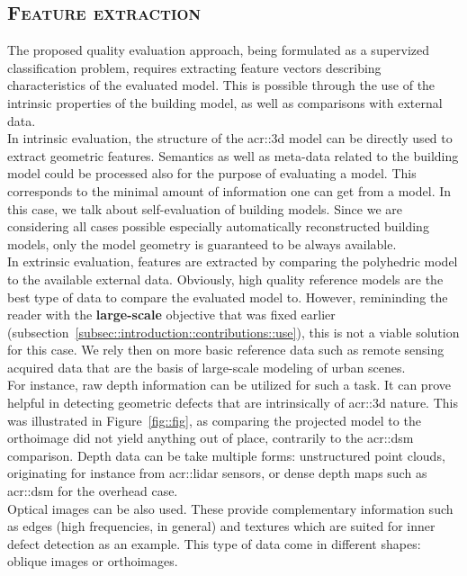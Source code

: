    \subsection{\textsc{Feature extraction}}
        \label{subsec::learned_evaluation::classification::feature_extraction}
        The proposed quality evaluation approach, being formulated as a supervized classification problem, requires extracting feature vectors describing characteristics of the evaluated model.
        This is possible through the use of the intrinsic properties of the building model, as well as comparisons with external data.\\
    
        In intrinsic evaluation, the structure of the \gls{acr::3d} model can be directly used to extract geometric features.
        Semantics as well as meta-data related to the building model could be processed also for the purpose of evaluating a model.
        This corresponds to the minimal amount of information one can get from a model.
        In this case, we talk about self-evaluation of building models.
        Since we are considering all cases possible especially automatically reconstructed building models, only the model geometry is guaranteed to be always available.\\
    
        In extrinsic evaluation, features are extracted by comparing the polyhedric model to the available external data.
        Obviously, high quality reference models are the best type of data to compare the evaluated model to.
        However, remininding the reader with the \textbf{large-scale} objective that was fixed earlier (subsection~\ref{subsec::introduction::contributions::use}), this is not a viable solution for this case.
        We rely then on more basic reference data such as remote sensing acquired data that are the basis of large-scale modeling of urban scenes.\\
        For instance, raw depth information can be utilized for such a task.
        It can prove helpful in detecting geometric defects that are intrinsically of \gls{acr::3d} nature.
        This was illustrated in Figure~\ref{fig::fig}, as comparing the projected model to the orthoimage did not yield anything out of place, contrarily to the \gls{acr::dsm} comparison.
        Depth data can be take multiple forms: unstructured point clouds, originating for instance from \gls{acr::lidar} sensors, or dense depth maps such as \gls{acr::dsm} for the overhead case.\\
        Optical images can be also used.
        These provide complementary information such as edges (high frequencies, in general) and textures which are suited for inner defect detection as an example.
        This type of data come in different shapes: oblique images or orthoimages.
    
